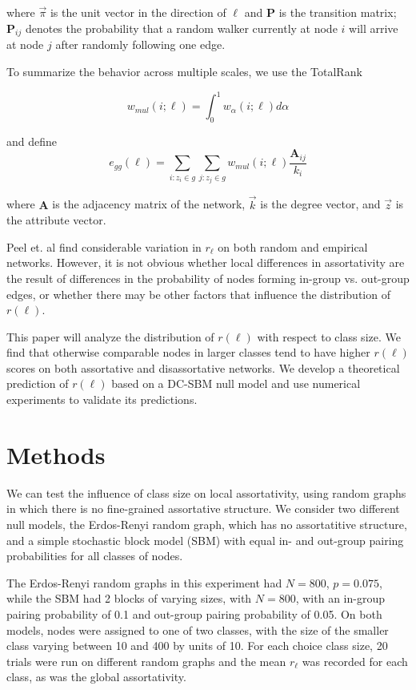 \documentclass[12pt]{article}
\begin{document}
where $\vec{\pi}$ is the unit vector in the direction of $\ell$ and $\mathbf{P}$ is the transition matrix; $\mathbf{P}_{ij}$ denotes the probability that a random walker currently at node $i$ will arrive at node $j$ after randomly following one edge.

To summarize the behavior across multiple scales, we use the TotalRank

\begin{equation}
  w_{mul}(i; \ell) = \int_0^1 w_\alpha(i; \ell) d\alpha
\end{equation} \cite{boldi:2005} \cite{Peel:2018}

and define
\begin{equation}
  e_{gg}(\ell) = \sum_{i: z_i \in g} \sum_{j: z_j \in g} w_{mul}(i; \ell) \frac{\mathbf{A}_{ij}}{k_i}
\end{equation} \cite{Peel:2018}

where $\mathbf{A}$ is the adjacency matrix of the network, $\vec{k}$ is the degree vector, and $\vec{z}$ is the attribute vector.

Peel et. al find considerable variation in $r_\ell$ on both random and empirical networks.  However, it is not obvious whether local differences in assortativity are the result of differences in the probability of nodes forming in-group vs. out-group edges, or whether there may be other factors that influence the distribution of $r(\ell)$.

This paper will analyze the distribution of $r(\ell)$ with respect to class size.  We find that otherwise comparable nodes in larger classes tend to have higher $r(\ell)$ scores on both assortative and disassortative networks.  We develop a theoretical prediction of $r(\ell)$ based on a DC-SBM null model and use numerical experiments to validate its predictions.

\section{Methods}
We can test the influence of class size on local assortativity, using random graphs in which there is no fine-grained assortative structure.  We consider two different null models, the Erdos-Renyi random graph, which has no assortatitive structure, and a simple stochastic block model (SBM) with equal in- and out-group pairing probabilities for all classes of nodes.

The Erdos-Renyi random graphs in this experiment had $N=800$, $p=0.075$, while the SBM had 2 blocks of varying sizes, with $N=800$, with an in-group pairing probability of 0.1 and out-group pairing probability of 0.05.  On both models, nodes were assigned to one of two classes, with the size of the smaller class varying between 10 and 400 by units of 10.  For each choice class size, 20 trials were run on different random graphs and the mean $r_\ell$ was recorded for each class, as was the global assortativity.
\end{document}
